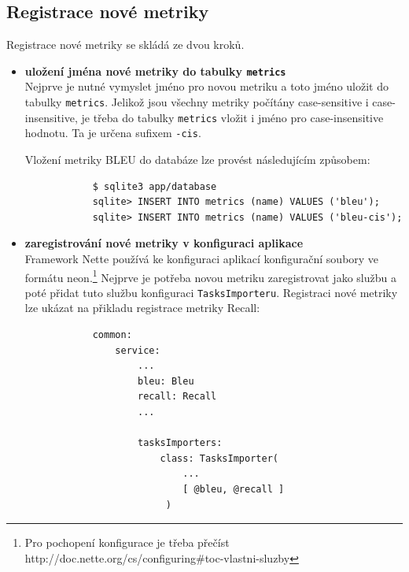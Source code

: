 \subsection{Registrace nové metriky}
Registrace nové metriky se skládá ze dvou kroků.
\begin{itemize}
	\item \textbf{uložení jména nové metriky do tabulky \texttt{metrics}} \\
		Nejprve je nutné vymyslet jméno pro novou metriku a toto jméno uložit do tabulky \texttt{metrics}. 
		Jelikož jsou všechny metriky počítány \mbox{case-sensitive} i \mbox{case-insensitive},
		  je třeba do tabulky \texttt{metrics} vložit i jméno pro \mbox{case-insensitive} hodnotu. 
		Ta je určena sufixem \texttt{-cis}.

		Vložení metriky BLEU do databáze lze provést následujícím způsobem:
		\begin{verbatim}
			$ sqlite3 app/database
			sqlite> INSERT INTO metrics (name) VALUES ('bleu');
			sqlite> INSERT INTO metrics (name) VALUES ('bleu-cis');
		\end{verbatim}

	\item \textbf{zaregistrování nové metriky v konfiguraci aplikace} \\
		Framework Nette používá ke konfiguraci aplikací konfigurační soubory ve formátu neon.\footnote{
			Pro pochopení konfigurace je třeba přečíst http://doc.nette.org/cs/configuring\#toc-vlastni-sluzby
		}
		Nejprve je potřeba novou metriku zaregistrovat jako službu a poté přidat tuto službu konfiguraci \texttt{TasksImporteru}.
		Registraci nové metriky lze ukázat na přikladu registrace metriky Recall:


		\begin{verbatim}
			common:
			    service:
			        ...
			        bleu: Bleu
			        recall: Recall 
			        ...

			        tasksImporters:
			            class: TasksImporter(
			                ...
			                [ @bleu, @recall ]
			             )
		\end{verbatim}
\end{itemize}
